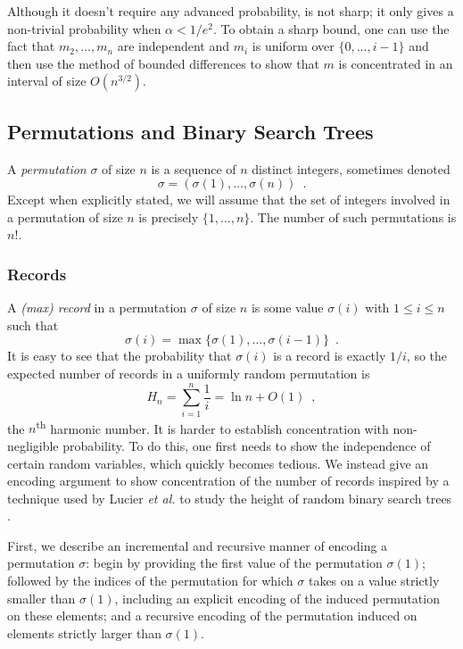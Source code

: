 \documentclass{patmorin}
\begin{document}
\begin{rem}
  Although it doesn't require any advanced probability,
   is not sharp; it only gives a non-trivial
  probability when $\alpha < 1/e^2$.  To obtain a sharp bound, one can
  use the fact that $m_2,\ldots,m_n$ are independent and $m_i$ is uniform
  over $\{0,\ldots,i-1\}$ and then use the method of bounded differences
  \cite{mcdiarmid:on} to show that $m$ is concentrated in an interval
  of size $O(n^{3/2})$.
\end{rem}

\subsection{Permutations and Binary Search Trees}

A \emph{permutation} $\sigma$ of size $n$ is a sequence of $n$
distinct integers, sometimes denoted
\[
\sigma = (\sigma(1), \ldots, \sigma(n)) \enspace .
\]
Except when explicitly stated, we will assume that the set of integers
involved in a permutation of size $n$ is precisely $\{1, \ldots,
n\}$. The number of such permutations is $n!$.

\subsubsection{Records}

A \emph{(max) record} in a permutation $\sigma$ of size $n$ is some
value $\sigma(i)$ with $1 \leq i \leq n$ such that
\[
\sigma(i) = \max\{\sigma(1), \ldots, \sigma(i - 1)\} \enspace .
\]
It is easy to see that the probability that $\sigma(i)$ is a record is
exactly $1/i$, so the expected number of records in a uniformly random
permutation is
\[
H_n = \sum_{i = 1}^n \frac{1}{i} = \ln n + O(1) \enspace ,
\]
the $n$\textsuperscript{th} harmonic number. It is harder to establish
concentration with non-negligible probability. To do this, one first
needs to show the independence of certain random variables, which
quickly becomes tedious. We instead give an encoding argument to show
concentration of the number of records inspired by a technique used by
Lucier \emph{et al.} to study the height of random binary search trees
\cite{lucier.jiang.li:quicksort}.

First, we describe an incremental and recursive manner of encoding a
permutation $\sigma$: begin by providing the first value of the
permutation $\sigma(1)$; followed by the indices of the permutation
for which $\sigma$ takes on a value strictly smaller than $\sigma(1)$,
including an explicit encoding of the induced permutation on these
elements; and a recursive encoding of the permutation induced on
elements strictly larger than $\sigma(1)$.
\end{document}
